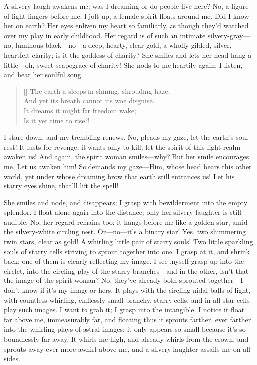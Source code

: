 \documentclass[12pt,a4paper]{article}
\begin{document}
A silvery laugh awakens me; was I dreaming or do people live here? No, a figure of light lingers before me; I jolt up, a female spirit floats around me. Did I know her on earth? Her eyes enliven my heart so familiarly, as though they’d watched over my play in early childhood. Her regard is of such an intimate silvery-gray—no, luminous black—no—a deep, hearty, clear gold, a wholly gilded, silver, heartfelt clarity; is it the goddess of charity? She smiles and lets her head hang a little—oh, sweet scapegrace of charity! She nods to me heartily again; I listen, and hear her soulful song.
\settowidth{\versewidth}{The earth a-sleeps in shining, shrouding haze;}
\begin{verse}[\versewidth]
The earth a-sleeps in shining, shrouding haze; \\
And yet its breath cannot its woe disguise. \\
It dreams it might for freedom wake; \\
Is it yet time to rise?!
\end{verse}
I stare down, and my trembling renews. No, pleads my gaze, let the earth’s soul rest! It lusts for revenge, it wants only to kill; let the spirit of this light-realm awaken us! And again, the spirit woman smiles—why? But her smile encourages me. Let us awaken him! So demands my gaze—Him, whose head bears this other world, yet under whose dreaming brow that earth still entrances us! Let his starry eyes shine, that’ll lift the spell!

She smiles and nods, and disappears; I grasp with bewilderment into the empty splendor. I float alone again into the distance; only her silvery laughter is still audible. No, her regard remains too; it hangs before me like a golden star, amid the silvery-white circling nest. Or—no—it’s a binary star! Yes, two shimmering twin stars, clear as gold! A whirling little pair of starry souls! Two little sparkling souls of starry cells striving to sprout together into one. I grasp at it, and shrink back: one of them is clearly reflecting my image. I see myself grasp up into the circlet, into the circling play of the starry branches—and in the other, isn’t that the image of the spirit woman? No, they’ve already both sprouted together—I don’t know if it’s my image or hers. It plays with the circling nidal balls of light, with countless whirling, endlessly small branchy, starry cells; and in all star-cells play such images. I want to grab it; I grasp into the intangible. I notice it float far above me, immeasurably far, and floating thus it sprouts farther, ever farther into the whirling plays of astral images; it only appears so small because it’s so boundlessly far away. It whirls me high, and already whirls from the crown, and sprouts away ever more awhirl above me, and a silvery laughter assails me on all sides.
\end{document}
